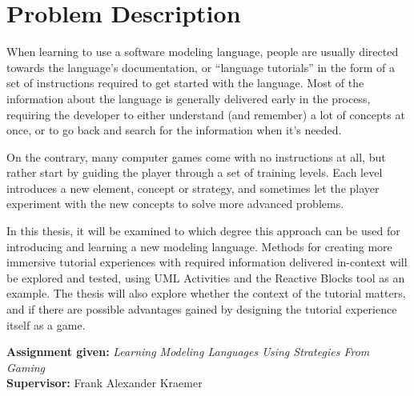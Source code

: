\chapter*{Problem Description}
When learning to use a software modeling language, people are usually directed towards the language's documentation, or ``language tutorials'' in the form of a set of instructions required to get started with the language. Most of the information about the language is generally delivered early in the process, requiring the developer to either understand (and remember) a lot of concepts at once, or to go back and search for the information when it's needed.

\noindent
On the contrary, many computer games come with no instructions at all, but rather start by guiding the player through a set of training levels. Each level introduces a new element, concept or strategy, and sometimes let the player experiment with the new concepts to solve more advanced problems.

\noindent
In this thesis, it will be examined to which degree this approach can be used for introducing and learning a new modeling language. Methods for creating more immersive tutorial experiences with required information delivered in-context will be explored and tested, using UML Activities and the Reactive Blocks tool as an example. The thesis will also explore whether the context of the tutorial matters, and if there are possible advantages gained by designing the tutorial experience itself as a game.

\noindent
\textbf{Assignment given:} \emph{Learning Modeling Languages Using Strategies From Gaming} \\
\textbf{Supervisor:} Frank Alexander Kraemer